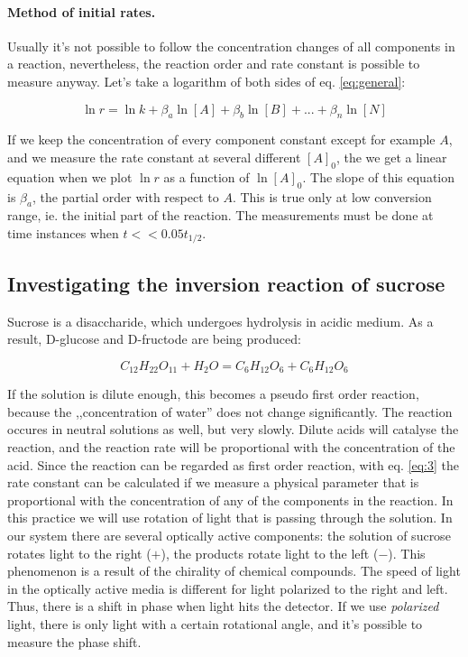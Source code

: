 \paragraph{Method of initial rates.}
Usually it's not possible to follow the concentration changes of all components in a reaction, nevertheless, the reaction order and rate constant is possible to measure anyway. Let's take a logarithm of both sides of eq. \ref{eq:general}: 

\begin{equation}
\label{eq:log}
	\ln r
	=
	\ln k
	+ \beta _a \ln [A]
	+ \beta _b \ln [B]
	+ ...
	+ \beta _n \ln [N]
\end{equation}

If we keep the concentration of every component constant except for example $A$, and we measure the rate constant at several different $[A]_0$, the we get a linear equation when we plot $\ln r$ as a function of $\ln [A]_0$. The slope of this equation is $\beta _a$, the partial order with respect to $A$.
This is true only at low conversion range, ie. the initial part of the reaction. The measurements must be done at time instances when $t << 0.05 t_{1/2}$.

\subsection{Investigating the inversion reaction of sucrose}
Sucrose is a disaccharide, which undergoes hydrolysis in acidic medium. As a result, D-glucose and D-fructode are being produced:

\begin{equation}
\label{eq:inversion}
	C_{12}H_{22}O_{11} + H_2O = C_6H_{12}O_6 + C_6H_{12}O_6
\end{equation}

If the solution is dilute enough, this becomes a pseudo first order reaction, because the ,,concentration of water'' does not change significantly.
The reaction occures in neutral solutions as well, but very slowly. Dilute acids will catalyse the reaction, and the reaction rate will be proportional with the concentration of the acid.
Since the reaction can be regarded as first order reaction, with eq. \ref{eq:3} the rate constant can be calculated if we measure a physical parameter that is proportional with the concentration of any of the components in the reaction.
In this practice we will use rotation of light that is passing through the solution.
In our system there are several optically active components: the solution of sucrose rotates light to the right ($+$), the products rotate light to the left ($-$).
This phenomenon is a result of the chirality of chemical compounds.
The speed of light in the optically active media is different for light polarized to the right and left.
Thus, there is a shift in phase when light hits the detector. If we use \emph{polarized} light, there is only light with a certain rotational angle, and it's possible to measure the phase shift.

